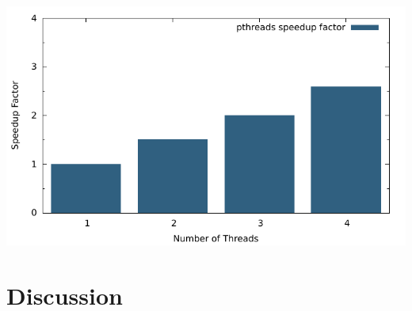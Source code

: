 \documentclass[titlepage,a4paper,10pt]{article}
\begin{document}
\includegraphics{plots/pthreads_speedup.pdf}


\section{Discussion}

\end{document}
